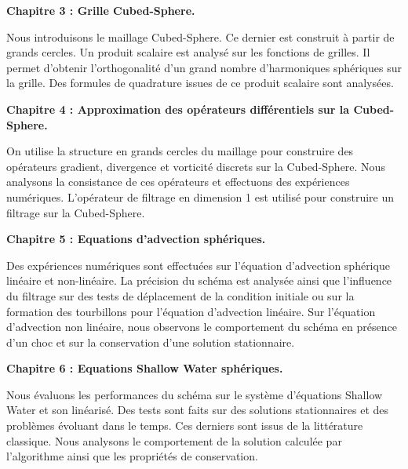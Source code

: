 \vspace{0.7cm}
\textbf{Chapitre 3 : Grille Cubed-Sphere.}

Nous introduisons le maillage Cubed-Sphere. Ce dernier est construit à partir de grands cercles. Un produit scalaire est analysé sur les fonctions de grilles. Il permet d'obtenir l'orthogonalité d'un grand nombre d'harmoniques sphériques sur la grille. Des formules de quadrature issues de ce produit scalaire sont analysées.






\vspace{0.7cm}
\textbf{Chapitre 4 : Approximation des opérateurs différentiels sur la Cubed-Sphere.}

On utilise la structure en grands cercles du maillage pour construire des opérateurs gradient, divergence et vorticité discrets sur la Cubed-Sphere. Nous analysons la consistance de ces opérateurs et effectuons des expériences numériques. L'opérateur de filtrage en dimension 1 est utilisé pour construire un filtrage sur la Cubed-Sphere.







\vspace{0.7cm}
\textbf{Chapitre 5 : Equations d'advection sphériques.}

Des expériences numériques sont effectuées sur l'équation d'advection sphérique linéaire et non-linéaire. La précision du schéma est analysée ainsi que l'influence du filtrage sur des tests de déplacement de la condition initiale ou sur la formation des tourbillons pour l'équation d'advection linéaire. Sur l'équation d'advection non linéaire, nous observons le comportement du schéma en présence d'un choc et sur la conservation d'une solution stationnaire.  







\vspace{0.7cm}
\textbf{Chapitre 6 : Equations Shallow Water sphériques.}

Nous évaluons les performances du schéma sur le système d'équations Shallow Water et son linéarisé. Des tests sont faits sur des solutions stationnaires et des problèmes évoluant dans le temps. Ces derniers sont issus de la littérature classique. Nous analysons le comportement de la solution calculée par l'algorithme ainsi que les propriétés de conservation.


